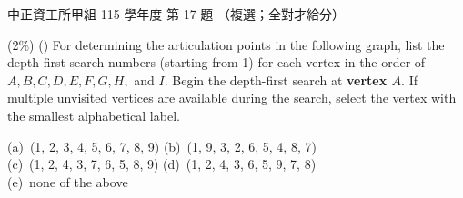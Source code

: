 \begin{pastexam}[label={px:ccu-115-swa-07}]{中正資工所甲組 115 學年度 第 17 題}
（複選；全對才給分）

(2\%) (\qquad) For determining the articulation points in the following graph, list the depth-first search
numbers (starting from 1) for each vertex in the order of $A, B, C, D, E, F, G, H,$ and $I$. Begin
the depth-first search at \textbf{vertex $A$}. If multiple unvisited vertices are available during
the search, select the vertex with the smallest alphabetical label.
\begin{center}
\end{center}
(a)~(1, 2, 3, 4, 5, 6, 7, 8, 9) \qquad (b)~(1, 9, 3, 2, 6, 5, 4, 8, 7)\\
(c)~(1, 2, 4, 3, 7, 6, 5, 8, 9) \qquad (d)~(1, 2, 4, 3, 6, 5, 9, 7, 8)\\
(e)~none of the above
\end{pastexam}

